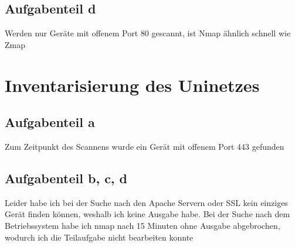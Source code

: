 \documentclass[a4paper,12pt,
headsepline,           %
oneside,               %
pointlessnumbers,      %
bibtotoc,              %
BCOR15mm               %
]{scrbook}
\begin{document}
\subsection*{Aufgabenteil d}

Werden nur Geräte mit offenem Port 80 gescannt, ist Nmap ähnlich schnell wie Zmap

\section*{Inventarisierung des Uninetzes}
\subsection*{Aufgabenteil a}
Zum Zeitpunkt des Scannens wurde ein Gerät mit offenem Port 443 gefunden


\subsection*{Aufgabenteil b, c, d}
Leider habe ich bei der Suche nach den Apache Servern oder SSL kein einziges Gerät finden können, weshalb ich keine Ausgabe habe. Bei der Suche nach dem Betriebssystem habe ich nmap nach 15 Minuten ohne Ausgabe abgebrochen, wodurch ich die Teilaufgabe nicht bearbeiten konnte
\end{document}
